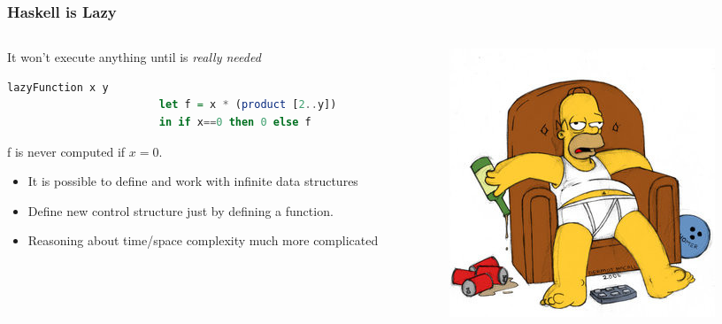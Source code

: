 	\begin{frame}[fragile]\frametitle{Haskell is Lazy}
			\begin{columns}[T] %
			\begin{column}{.67\textwidth}

			\begin{alertblock}{It won't execute anything until is \emph{really
			needed}} \begin{lstlisting}[language=Haskell]
					lazyFunction x y 
						let f = x * (product [2..y])
						in if x==0 then 0 else f
					\end{lstlisting}
					f is never computed if $x=0$.
					\begin{itemize}
					  	\item It is possible to define and work with infinite data structures
					  \item Define new control structure just by defining a function.
					  \item Reasoning about time/space complexity much more complicated
					\end{itemize}
			\end{alertblock}
			

			\end{column}%
			\hfill%
			\begin{column}{.45\textwidth}
			\includegraphics[scale=0.5]{./images/homer}
			\end{column}%
			\end{columns}
			
			
	\end{frame}
